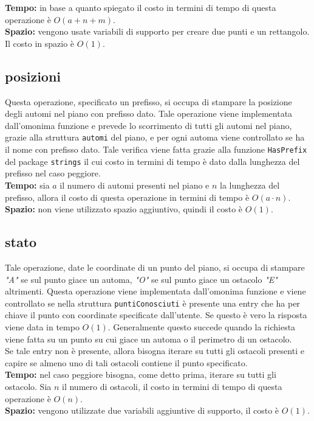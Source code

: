 \documentclass[a4paper,11pt]{article}
\begin{document}
\textbf{Tempo:} in base a quanto spiegato il costo in termini di tempo di questa operazione è $O(a + n + m)$.\\
\textbf{Spazio:} vengono usate variabili di supporto per creare due punti e un rettangolo. Il costo in spazio è $O(1)$. 

\subsection{posizioni}

Questa operazione, specificato un prefisso, si occupa di stampare la posizione degli automi nel piano con prefisso dato. Tale operazione viene implementata dall'omonima funzione e prevede lo scorrimento di tutti gli automi nel piano, grazie alla struttura \texttt{automi} del piano, e per ogni automa viene controllato se ha il nome con prefisso dato. Tale verifica viene fatta grazie alla funzione \texttt{HasPrefix} del package \texttt{strings} il cui costo in termini di tempo è dato dalla lunghezza del prefisso nel caso peggiore. \\
\textbf{Tempo:} sia $a$ il numero di automi presenti nel piano e $n$ la lunghezza del prefisso, allora il costo di questa operazione in termini di tempo è $O(a \cdot n)$.\\
\textbf{Spazio:} non viene utilizzato spazio aggiuntivo, quindi il costo è $O(1)$.


\subsection{stato}

Tale operazione, date le coordinate di un punto del piano, si occupa di stampare \textit{"A"} se sul punto giace un automa, \textit{"O"} se sul punto giace un ostacolo \textit{"E"} altrimenti. Questa operazione viene implementata dall'omonima funzione e viene controllato se nella struttura \texttt{puntiConosciuti} è presente una entry che ha per chiave il punto con coordinate specificate dall'utente. Se questo è vero la risposta viene data in tempo $O(1)$. Generalmente questo succede quando la richiesta viene fatta su un punto su cui giace un automa o il perimetro di un ostacolo.\\
Se tale entry non è presente, allora bisogna iterare su tutti gli ostacoli presenti e capire se almeno uno di tali ostacoli contiene il punto specificato. \\
\textbf{Tempo:} nel caso peggiore bisogna, come detto prima, iterare su tutti gli ostacolo. Sia $n$ il numero di ostacoli, il costo in termini di tempo di questa operazione è $O(n)$.\\
\textbf{Spazio:} vengono utilizzate due variabili aggiuntive di supporto, il costo è $O(1)$. 
\end{document}
